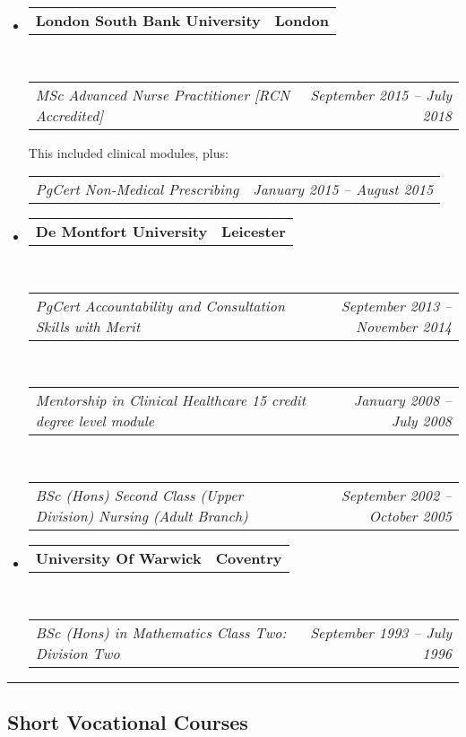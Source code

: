 \documentclass{article}
\makeatletter
\newcommand{\headerrow}[2]
{\begin{tabular*}{\linewidth}{l@{\extracolsep{\fill}}r}
	#1 &
	#2 \\
\end{tabular*}}
\makeatother
\begin{document}
\begin{itemize}
	\parskip=0.1em

	\item 
	\headerrow
		{\textbf{London South Bank University}}
		{\textbf{London}}
	\\
	\headerrow
		{\emph{MSc Advanced Nurse Practitioner [RCN Accredited]}}
		{\emph{September 2015 -- July 2018}}
	This included clinical modules, plus:
	\headerrow
		{\emph{PgCert Non-Medical Prescribing}}
		{\emph{January 2015 -- August 2015}}
	\item 
	\headerrow
		{\textbf{De Montfort University}}
		{\textbf{Leicester}}
	\\
	\headerrow
		{\emph{PgCert Accountability and Consultation Skills with Merit}}
		{\emph{September 2013 -- November 2014}}
	\\
	\headerrow
		{\emph{Mentorship in Clinical Healthcare 15 credit degree level module}}
		{\emph{January 2008 -- July 2008}}
	\\
	\headerrow
		{\emph{BSc (Hons) Second Class (Upper Division) Nursing (Adult Branch)}}
		{\emph{September 2002 -- October 2005}}
	\item 
	\headerrow
		{\textbf{University Of Warwick}}
		{\textbf{Coventry}}
	\\
	\headerrow
		{\emph{BSc (Hons) in Mathematics Class Two: Division Two}}
		{\emph{September 1993 -- July 1996}}
	
\end{itemize}


\hrule
\vspace{-0.4em}
\subsection*{Short Vocational Courses}
\end{document}
